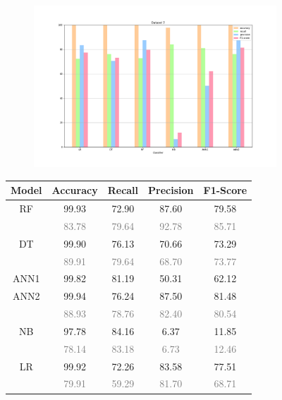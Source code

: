 \documentclass{Configuration_Files/PoliMi3i_thesis}
\begin{document}
\begin{figure}[H]
\centering
\begin{subfigure}
    \centering
    \includegraphics[scale=0.3]{Images/Dataset_7.png}
\end{subfigure}

\renewcommand{\arraystretch}{0.8}%
\begin{table}[H]
\centering 
    \begin{tabular}{ c  c  c  c  c }
    \hline 
    \textbf{Model}  & \textbf{Accuracy} & \textbf{Recall} & \textbf{Precision} & \textbf{F1-Score} \\
    \hline
    RF	& 99.93 &	72.90 &	87.60 &	79.58 \\
        & \footnotesize\textcolor{gray}{83.78} & \footnotesize\textcolor{gray}{79.64} & \footnotesize\textcolor{gray}{92.78} & \footnotesize\textcolor{gray}{85.71} \\[0.01cm]
    DT	& 99.90 &	76.13 &	70.66 &	73.29 \\
        & \footnotesize\textcolor{gray}{89.91} & \footnotesize\textcolor{gray}{79.64} & \footnotesize\textcolor{gray}{68.70} & \footnotesize\textcolor{gray}{73.77} \\
    ANN1 & 99.82 & 81.19 & 50.31 & 62.12 \\
    ANN2 & 99.94 & 76.24 & 87.50 & 81.48 \\
         & \footnotesize\textcolor{gray}{88.93} & \footnotesize\textcolor{gray}{78.76} & \footnotesize\textcolor{gray}{82.40} & \footnotesize\textcolor{gray}{80.54} \\
    NB	& 97.78 &	84.16 &	6.37 &	11.85 \\
        & \footnotesize\textcolor{gray}{78.14} & \footnotesize\textcolor{gray}{83.18} & \footnotesize\textcolor{gray}{6.73} & \footnotesize\textcolor{gray}{12.46} \\
    LR	& 99.92 & 72.26 &	83.58 &	77.51 \\
        & \footnotesize\textcolor{gray}{79.91} & \footnotesize\textcolor{gray}{59.29} & \footnotesize\textcolor{gray}{81.70} & \footnotesize\textcolor{gray}{68.71} \\
    \hline
    \end{tabular}
\end{table}


\end{figure}
\end{document}
